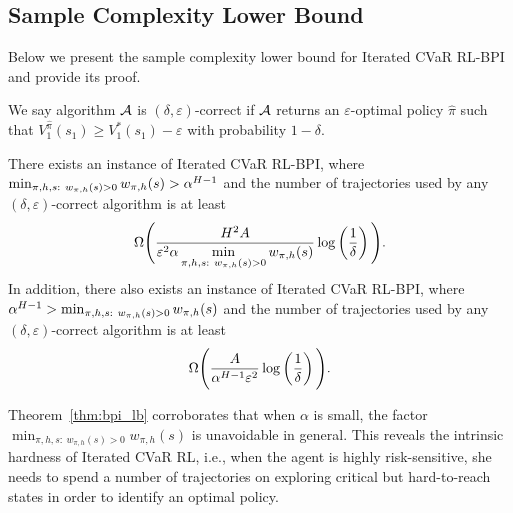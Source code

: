 \subsection{Sample Complexity Lower Bound}\label{apx:lb_bpi} 

Below we present the sample complexity lower bound for Iterated CVaR RL-BPI and provide its proof.

We say algorithm $\mathcal{A}$ is $(\delta,\varepsilon)$-correct if $\mathcal{A}$ returns an $\varepsilon$-optimal policy $\hat{\pi}$ such that
$
V^{\hat{\pi}}_1(s_1) \geq V^{*}_1(s_1) - \varepsilon 
$ 
with probability $1-\delta$.

\begin{theorem} \label{thm:bpi_lb}
	There exists an instance of Iterated CVaR RL-BPI, where $\min_{\begin{subarray}{c}\pi,h,s:\  w_{\pi,h}(s)>0\end{subarray}} w_{\pi,h}(s) > \alpha^{H-1}$ and the number of trajectories used by any $(\delta,\varepsilon)$-correct algorithm is at least 
	\begin{align*}
		\Omega \Bigg( \frac{ H^2 A}{\varepsilon^2 \alpha \min \limits_{\begin{subarray}{c}\pi,h,s:\  w_{\pi,h}(s)>0\end{subarray}} w_{\pi,h}(s)} \log \left( \frac{1}{\delta} \right) \Bigg) .
	\end{align*}
	In addition, there also exists an instance of Iterated CVaR RL-BPI, where $\alpha^{H-1} > \min_{\begin{subarray}{c}\pi,h,s:\  w_{\pi,h}(s)>0\end{subarray}} w_{\pi,h}(s)$ and the number of trajectories used by any $(\delta,\varepsilon)$-correct algorithm is at least 
	\begin{align*}
		\Omega \Bigg( \frac{A}{\alpha^{H-1} \varepsilon^2} \log \left( \frac{1}{\delta} \right) \Bigg) .
	\end{align*}
\end{theorem}

Theorem~\ref{thm:bpi_lb} corroborates that when $\alpha$ is small, the factor $\min_{\pi,h,s:\ w_{\pi,h}(s)>0} w_{\pi,h}(s)$ is unavoidable in general. This reveals the intrinsic hardness of Iterated CVaR RL, i.e., when the agent is highly risk-sensitive, she needs to spend a number of trajectories on exploring critical but hard-to-reach states in order to identify an optimal policy.

